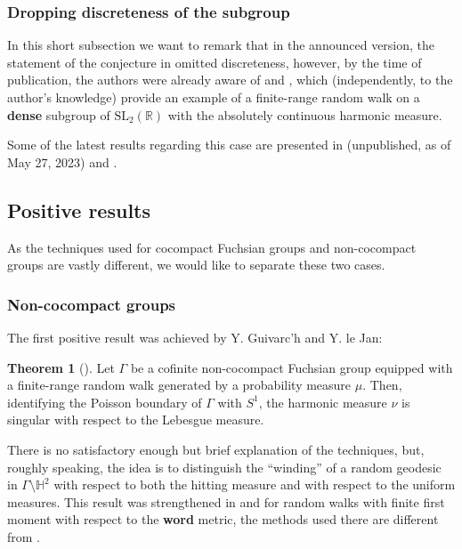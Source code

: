 \documentclass[11pt]{amsart}
\theoremstyle{definition}
\newtheorem{theorem}{Theorem}[section]
\begin{document}
	\subsubsection{Dropping discreteness of the subgroup}
	In this short subsection we want to remark that in the announced version, the statement of the conjecture in \cite{kaimanovich2011matrix} omitted discreteness, however, by the time of publication, the authors were already aware of \cite{Bourgain2012} and \cite{MR2969625}, which (independently, to the author's knowledge) provide an example of a finite-range random walk on a \textbf{dense} subgroup of $\text{SL}_2(\mathbb{R})$ with the absolutely continuous harmonic measure.
	
	Some of the latest results regarding this case are presented in (unpublished, as of May 27, 2023) \cite{kogler2022local} and \cite{kittle2023absolutely}.
		
	\subsection{Positive results}
	
	As the techniques used for cocompact Fuchsian groups and non-cocompact groups are vastly different, we would like to separate these two cases.
	
	\subsubsection{Non-cocompact groups}
	
	The first positive result was achieved by Y. Guivarc'h and Y. le Jan:
	
	\begin{theorem}[\cite{guivarch1990}]
		\label{IntT: singular for non-cocompact}
		Let $\Gamma$ be a cofinite non-cocompact Fuchsian group equipped with a finite-range random walk generated by a probability measure $\mu$. Then, identifying the Poisson boundary of $\Gamma$ with $S^1$, the harmonic measure $\nu$ is singular with respect to the Lebesgue measure. 
	\end{theorem}
	
	There is no satisfactory enough but brief explanation of the techniques, but, roughly speaking, the idea is to distinguish the ``winding'' of a random geodesic in $\Gamma \setminus \mathbb{H}^2$ with respect to both the hitting measure and with respect to the uniform measures. This result was strengthened in \cite{MR2568439} and 
	\cite{Gadre2015WordLS} for random walks with finite first moment with respect to the \textbf{word} metric, the methods used there are different from \cite{guivarch1990}.
	
\end{document}
